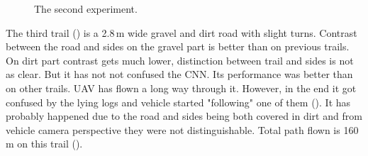 \begin{figure}[!h]

  \centering

  \centering	
  


  \caption{The second experiment.}
  \label{fig:second_trail_photos}
\end{figure}

The third trail () is a 2.8\,m wide gravel and dirt road with slight turns. Contrast between the road and sides on the gravel part is better than on previous trails. On dirt part contrast gets much lower, distinction between trail and sides is not as clear. But it has not not confused the \acs{CNN}. Its performance was better than on other trails. \acs{UAV} has flown a long way through it. However, in the end it got confused by the lying logs and vehicle started "following" one of them (). It has probably happened due to the road and sides being both covered in dirt and from vehicle camera perspective they were not distinguishable. Total path flown is 160\,m on this trail ().

